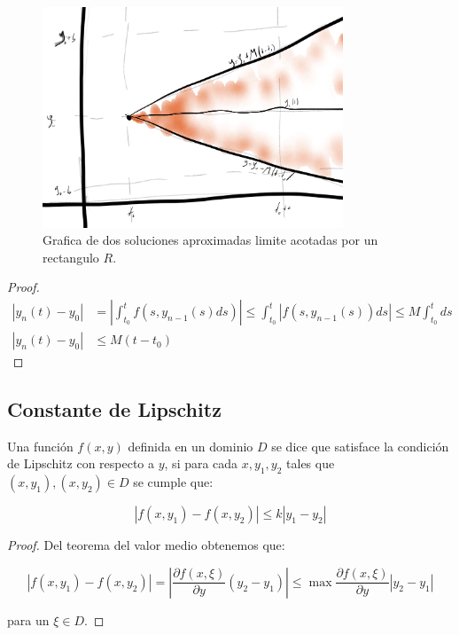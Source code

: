 		\begin{figure}
            \centering
            \includegraphics[width=0.8\textwidth]{./imagenes/2.PNG}
            \caption{\label{fig:pic}Grafica de dos soluciones aproximadas limite acotadas por un rectangulo $R$.}
        \end{figure}

		\begin{proof}
			\begin{align*}
				|y_n(t) - y_0| &= \left| \int_{t_0}^t f(s, y_{n-1}(s) ds) \right| \leq \int_{t_0}^t \left| f(s, y_{n-1}(s)) ds \right| \leq M \int_{t_0}^t ds \\
				|y_n(t) - y_0| &\leq M(t - t_0)
			\end{align*}
		\end{proof}

	\newpage
	\subsection{Constante de Lipschitz}

		\begin{definicion}
			Una función $f(x, y)$ definida en un dominio $D$ se dice que satisface la condición de Lipschitz con respecto a $y$, si para cada $x, y_1, y_2$ tales que $(x, y_1), (x, y_2) \in D$ se cumple que:

			\begin{equation}
				|f(x, y_1) - f(x, y_2)| \leq k |y_1 - y_2|
			\end{equation}
		\end{definicion}

		\begin{proof}
			Del teorema del valor medio obtenemos que:

			\begin{equation}
				|f(x, y_1) - f(x, y_2)| = \left| \frac{\partial f(x, \xi)}{\partial y} (y_2 - y_1) \right| \leq \max{\frac{\partial f(x, \xi)}{\partial y} |y_2 - y_1|}
			\end{equation}

			para un $\xi \in D$.
		\end{proof}

